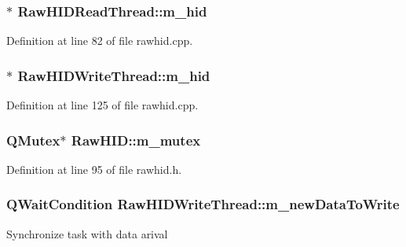 \hypertarget{group___raw_h_i_d_plugin_gae4904e50399d18b7cce82e865d43dcbc}{
\subsubsection[{m\-\_\-hid}]{$\ast$ {\bf \-Raw\-H\-I\-D\-Read\-Thread\-::m\-\_\-hid}}}\label{group___raw_h_i_d_plugin_gae4904e50399d18b7cce82e865d43dcbc}


\-Definition at line 82 of file rawhid.\-cpp.

\hypertarget{group___raw_h_i_d_plugin_ga753f0d79e5633e60df867fe7c35dd6e4}{
\subsubsection[{m\-\_\-hid}]{$\ast$ {\bf \-Raw\-H\-I\-D\-Write\-Thread\-::m\-\_\-hid}}}\label{group___raw_h_i_d_plugin_ga753f0d79e5633e60df867fe7c35dd6e4}


\-Definition at line 125 of file rawhid.\-cpp.

\hypertarget{group___raw_h_i_d_plugin_ga915d676c812135bc006e37a140a52365}{
\subsubsection[{m\-\_\-mutex}]{\setlength{\rightskip}{0pt plus 5cm}\-Q\-Mutex$\ast$ {\bf \-Raw\-H\-I\-D\-::m\-\_\-mutex}}}\label{group___raw_h_i_d_plugin_ga915d676c812135bc006e37a140a52365}


\-Definition at line 95 of file rawhid.\-h.

\hypertarget{group___raw_h_i_d_plugin_ga1554ff98394a7da1f15042ff26061348}{
\subsubsection[{m\-\_\-new\-Data\-To\-Write}]{\setlength{\rightskip}{0pt plus 5cm}\-Q\-Wait\-Condition {\bf \-Raw\-H\-I\-D\-Write\-Thread\-::m\-\_\-new\-Data\-To\-Write}}}\label{group___raw_h_i_d_plugin_ga1554ff98394a7da1f15042ff26061348}
\-Synchronize task with data arival 

